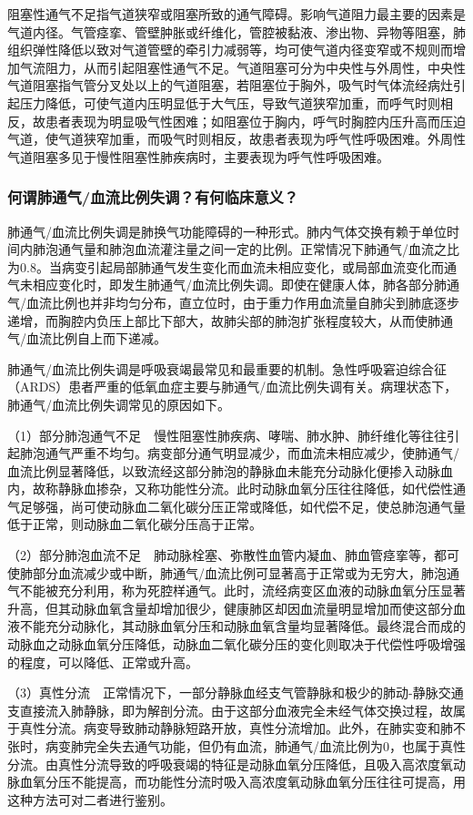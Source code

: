 阻塞性通气不足指气道狭窄或阻塞所致的通气障碍。影响气道阻力最主要的因素是气道内径。气管痉挛、管壁肿胀或纤维化，管腔被黏液、渗出物、异物等阻塞，肺组织弹性降低以致对气道管壁的牵引力减弱等，均可使气道内径变窄或不规则而增加气流阻力，从而引起阻塞性通气不足。气道阻塞可分为中央性与外周性，中央性气道阻塞指气管分叉处以上的气道阻塞，若阻塞位于胸外，吸气时气体流经病灶引起压力降低，可使气道内压明显低于大气压，导致气道狭窄加重，而呼气时则相反，故患者表现为明显吸气性困难；如阻塞位于胸内，呼气时胸腔内压升高而压迫气道，使气道狭窄加重，而吸气时则相反，故患者表现为呼气性呼吸困难。外周性气道阻塞多见于慢性阻塞性肺疾病时，主要表现为呼气性呼吸困难。

\subsubsection{何谓肺通气/血流比例失调？有何临床意义？}

肺通气/血流比例失调是肺换气功能障碍的一种形式。肺内气体交换有赖于单位时间内肺泡通气量和肺泡血流灌注量之间一定的比例。正常情况下肺通气/血流之比为0.8。当病变引起局部肺通气发生变化而血流未相应变化，或局部血流变化而通气未相应变化时，即发生肺通气/血流比例失调。即使在健康人体，肺各部分肺通气/血流比例也并非均匀分布，直立位时，由于重力作用血流量自肺尖到肺底逐步递增，而胸腔内负压上部比下部大，故肺尖部的肺泡扩张程度较大，从而使肺通气/血流比例自上而下递减。

肺通气/血流比例失调是呼吸衰竭最常见和最重要的机制。急性呼吸窘迫综合征（ARDS）患者严重的低氧血症主要与肺通气/血流比例失调有关。病理状态下，肺通气/血流比例失调常见的原因如下。

（1）部分肺泡通气不足　慢性阻塞性肺疾病、哮喘、肺水肿、肺纤维化等往往引起肺泡通气严重不均匀。病变部分通气明显减少，而血流未相应减少，使肺通气/血流比例显著降低，以致流经这部分肺泡的静脉血未能充分动脉化便掺入动脉血内，故称静脉血掺杂，又称功能性分流。此时动脉血氧分压往往降低，如代偿性通气足够强，尚可使动脉血二氧化碳分压正常或降低，如代偿不足，使总肺泡通气量低于正常，则动脉血二氧化碳分压高于正常。

（2）部分肺泡血流不足　肺动脉栓塞、弥散性血管内凝血、肺血管痉挛等，都可使肺部分血流减少或中断，肺通气/血流比例可显著高于正常或为无穷大，肺泡通气不能被充分利用，称为死腔样通气。此时，流经病变区血液的动脉血氧分压显著升高，但其动脉血氧含量却增加很少，健康肺区却因血流量明显增加而使这部分血液不能充分动脉化，其动脉血氧分压和动脉血氧含量均显著降低。最终混合而成的动脉血之动脉血氧分压降低，动脉血二氧化碳分压的变化则取决于代偿性呼吸增强的程度，可以降低、正常或升高。

（3）真性分流　正常情况下，一部分静脉血经支气管静脉和极少的肺动-静脉交通支直接流入肺静脉，即为解剖分流。由于这部分血液完全未经气体交换过程，故属于真性分流。病变导致肺动静脉短路开放，真性分流增加。此外，在肺实变和肺不张时，病变肺完全失去通气功能，但仍有血流，肺通气/血流比例为0，也属于真性分流。由真性分流导致的呼吸衰竭的特征是动脉血氧分压降低，且吸入高浓度氧动脉血氧分压不能提高，而功能性分流时吸入高浓度氧动脉血氧分压往往可提高，用这种方法可对二者进行鉴别。

